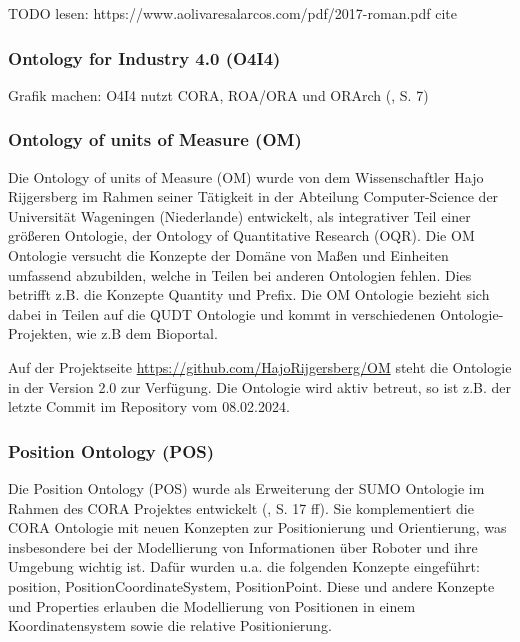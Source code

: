 \documentclass{article}
\begin{document}
TODO lesen: https://www.aolivaresalarcos.com/pdf/2017-roman.pdf
cite \cite{olszewska2017ontology}

\subsubsection{Ontology for Industry 4.0 (O4I4)}

\cite{kumar2019ontologies}

Grafik machen: O4I4 nutzt CORA, ROA/ORA und ORArch (\cite{kumar2019ontologies}, S. 7)

\subsubsection{Ontology of units of Measure (OM)}

Die Ontology of units of Measure (OM) wurde von dem Wissenschaftler Hajo Rijgersberg im Rahmen seiner Tätigkeit in der Abteilung Computer-Science der Universität Wageningen (Niederlande) entwickelt, als integrativer Teil einer größeren Ontologie\cite{rijgersberg2013ontology}, der Ontology of Quantitative Research (OQR).
Die OM Ontologie versucht die Konzepte der Domäne von Maßen und Einheiten umfassend abzubilden, welche in Teilen bei anderen Ontologien fehlen. Dies betrifft z.B. die Konzepte Quantity und Prefix. Die OM Ontologie bezieht sich dabei in Teilen auf die QUDT Ontologie und kommt in verschiedenen Ontologie-Projekten, wie z.B dem Bioportal\cite{OM_BioPortal}.

Auf der Projektseite \url{https://github.com/HajoRijgersberg/OM} steht die Ontologie in der Version 2.0 zur Verfügung. Die Ontologie wird aktiv betreut, so ist z.B. der letzte Commit im Repository vom 08.02.2024.

\subsubsection{Position Ontology (POS)}


Die Position Ontology (POS) wurde als Erweiterung der SUMO Ontologie im Rahmen des CORA Projektes entwickelt (\cite{fiorini2015extensions}, S. 17 ff).
Sie komplementiert die CORA Ontologie mit neuen Konzepten zur Positionierung und Orientierung, was insbesondere bei der Modellierung von Informationen über Roboter und ihre Umgebung wichtig ist.
Dafür wurden u.a. die folgenden Konzepte eingeführt: position, PositionCoordinateSystem, PositionPoint.
Diese und andere Konzepte und Properties erlauben die Modellierung von Positionen in einem Koordinatensystem sowie die relative Positionierung.
\end{document}
